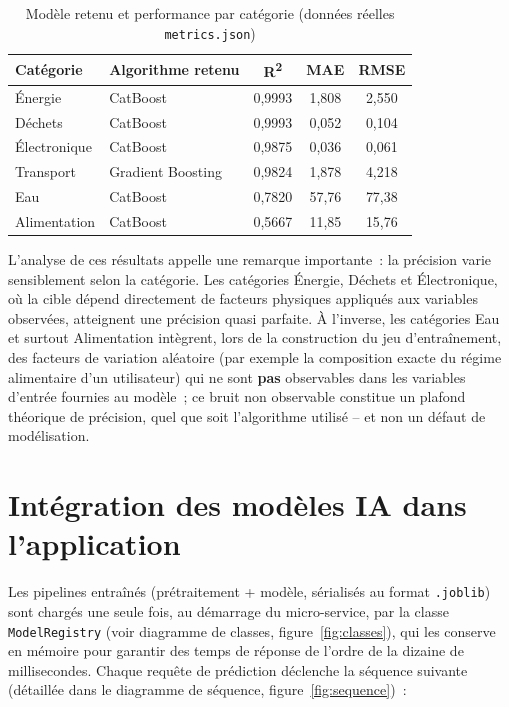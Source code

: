 \begin{table}[H]
\centering
\caption{Modèle retenu et performance par catégorie (données réelles \texttt{metrics.json})}
\label{tab:resultats-globaux}
\begin{tabular}{|l|l|c|c|c|}
\hline
\rowcolor{isiBlue!15}
\textbf{Catégorie} & \textbf{Algorithme retenu} & \textbf{R\textsuperscript{2}} & \textbf{MAE} & \textbf{RMSE} \\
\hline
Énergie & CatBoost & 0,9993 & 1,808 & 2,550 \\ \hline
Déchets & CatBoost & 0,9993 & 0,052 & 0,104 \\ \hline
Électronique & CatBoost & 0,9875 & 0,036 & 0,061 \\ \hline
Transport & Gradient Boosting & 0,9824 & 1,878 & 4,218 \\ \hline
Eau & CatBoost & 0,7820 & 57,76 & 77,38 \\ \hline
Alimentation & CatBoost & 0,5667 & 11,85 & 15,76 \\ \hline
\end{tabular}
\end{table}

L'analyse de ces résultats appelle une remarque importante~: la précision varie sensiblement selon la catégorie. Les catégories Énergie, Déchets et Électronique, où la cible dépend directement de facteurs physiques appliqués aux variables observées, atteignent une précision quasi parfaite. À l'inverse, les catégories Eau et surtout Alimentation intègrent, lors de la construction du jeu d'entraînement, des facteurs de variation aléatoire (par exemple la composition exacte du régime alimentaire d'un utilisateur) qui ne sont \textbf{pas} observables dans les variables d'entrée fournies au modèle~; ce bruit non observable constitue un plafond théorique de précision, quel que soit l'algorithme utilisé -- et non un défaut de modélisation.

\section{Intégration des modèles IA dans l'application}

Les pipelines entraînés (prétraitement + modèle, sérialisés au format \texttt{.joblib}) sont chargés une seule fois, au démarrage du micro-service, par la classe \texttt{ModelRegistry} (voir diagramme de classes, figure~\ref{fig:classes}), qui les conserve en mémoire pour garantir des temps de réponse de l'ordre de la dizaine de millisecondes. Chaque requête de prédiction déclenche la séquence suivante (détaillée dans le diagramme de séquence, figure~\ref{fig:sequence})~:

